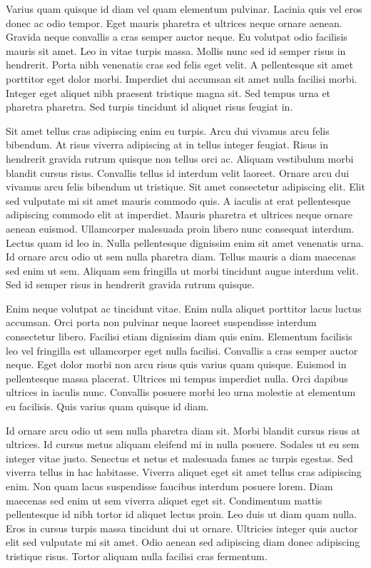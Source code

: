 \documentclass[11pt,a4paper]{article}
\begin{document}
Varius quam quisque id diam vel quam elementum pulvinar. Lacinia quis vel eros donec ac odio tempor. Eget mauris pharetra et ultrices neque ornare aenean. Gravida neque convallis a cras semper auctor neque. Eu volutpat odio facilisis mauris sit amet. Leo in vitae turpis massa. Mollis nunc sed id semper risus in hendrerit. Porta nibh venenatis cras sed felis eget velit. A pellentesque sit amet porttitor eget dolor morbi. Imperdiet dui accumsan sit amet nulla facilisi morbi. Integer eget aliquet nibh praesent tristique magna sit. Sed tempus urna et pharetra pharetra. Sed turpis tincidunt id aliquet risus feugiat in.

Sit amet tellus cras adipiscing enim eu turpis. Arcu dui vivamus arcu felis bibendum. At risus viverra adipiscing at in tellus integer feugiat. Risus in hendrerit gravida rutrum quisque non tellus orci ac. Aliquam vestibulum morbi blandit cursus risus. Convallis tellus id interdum velit laoreet. Ornare arcu dui vivamus arcu felis bibendum ut tristique. Sit amet consectetur adipiscing elit. Elit sed vulputate mi sit amet mauris commodo quis. A iaculis at erat pellentesque adipiscing commodo elit at imperdiet. Mauris pharetra et ultrices neque ornare aenean euismod. Ullamcorper malesuada proin libero nunc consequat interdum. Lectus quam id leo in. Nulla pellentesque dignissim enim sit amet venenatis urna. Id ornare arcu odio ut sem nulla pharetra diam. Tellus mauris a diam maecenas sed enim ut sem. Aliquam sem fringilla ut morbi tincidunt augue interdum velit. Sed id semper risus in hendrerit gravida rutrum quisque.

Enim neque volutpat ac tincidunt vitae. Enim nulla aliquet porttitor lacus luctus accumsan. Orci porta non pulvinar neque laoreet suspendisse interdum consectetur libero. Facilisi etiam dignissim diam quis enim. Elementum facilisis leo vel fringilla est ullamcorper eget nulla facilisi. Convallis a cras semper auctor neque. Eget dolor morbi non arcu risus quis varius quam quisque. Euismod in pellentesque massa placerat. Ultrices mi tempus imperdiet nulla. Orci dapibus ultrices in iaculis nunc. Convallis posuere morbi leo urna molestie at elementum eu facilisis. Quis varius quam quisque id diam.

Id ornare arcu odio ut sem nulla pharetra diam sit. Morbi blandit cursus risus at ultrices. Id cursus metus aliquam eleifend mi in nulla posuere. Sodales ut eu sem integer vitae justo. Senectus et netus et malesuada fames ac turpis egestas. Sed viverra tellus in hac habitasse. Viverra aliquet eget sit amet tellus cras adipiscing enim. Non quam lacus suspendisse faucibus interdum posuere lorem. Diam maecenas sed enim ut sem viverra aliquet eget sit. Condimentum mattis pellentesque id nibh tortor id aliquet lectus proin. Leo duis ut diam quam nulla. Eros in cursus turpis massa tincidunt dui ut ornare. Ultricies integer quis auctor elit sed vulputate mi sit amet. Odio aenean sed adipiscing diam donec adipiscing tristique risus. Tortor aliquam nulla facilisi cras fermentum.
\end{document}
